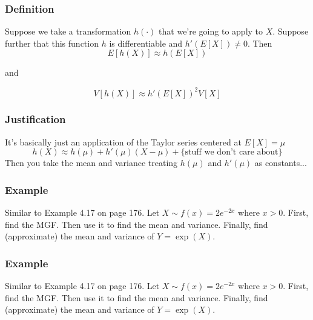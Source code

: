 \documentclass{beamer}
\begin{document}


\begin{frame}
\frametitle{Definition}

Suppose we take a transformation $h(\cdot)$ that we're going to apply to $X$. Suppose further that this function $h$ is differentiable and $h'(E[X]) \neq 0$. Then 
\[
E[h(X)] \approx h(E[X])
\]

and 

\[
V[h(X)] \approx h'(E[X])^2 V[X]
\]

\end{frame}



\begin{frame}
\frametitle{Justification}

It's basically just an application of the Taylor series centered at $E[X] = \mu$
\[
h(X) \approx h(\mu) + h'(\mu)(X-\mu) + \{\text{stuff we don't care about}\}
\]
Then you take the mean and variance treating $h(\mu)$ and $h'(\mu)$ as constants...
\end{frame}



\begin{frame}
\frametitle{Example}

Similar to Example 4.17 on page 176. Let $X \sim f(x) = 2e^{-2x}$ where $x > 0$. First, find the MGF. Then use it to find the mean and variance. Finally, find (approximate) the mean and variance of $Y = \exp(X)$.

\end{frame}


\begin{frame}
\frametitle{Example}

Similar to Example 4.17 on page 176. Let $X \sim f(x) = 2e^{-2x}$ where $x > 0$. First, find the MGF. Then use it to find the mean and variance. Finally, find (approximate) the mean and variance of $Y = \exp(X)$.

\end{frame}

\end{document}
